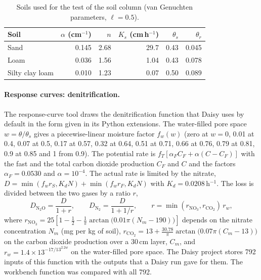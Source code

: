 \begin{table}[H]\centering\small
\caption{Soils used for the test of the soil column (van Genuchten parameters, $\ell=0.5$).}\label{tab:richardssoils}
\begin{tabular}{lrrrrr}\toprule
Soil & $\alpha$ (cm$^{-1}$) & $n$ & $K_s$ (cm\,h$^{-1}$) & $\theta_s$ & $\theta_r$\\\midrule
Sand & 0.145 & 2.68 & 29.7 & 0.43 & 0.045\\
Loam & 0.036 & 1.56 & 1.04 & 0.43 & 0.078\\
Silty clay loam & 0.010 & 1.23 & 0.07 & 0.50 & 0.089\\\bottomrule
\end{tabular}
\end{table}

\paragraph{Response curves: denitrification.}
The response-curve tool draws the denitrification function that Daisy uses by default in the form given in its Python extensions. The water-filled pore space $w=\theta/\theta_s$ gives a piecewise-linear moisture factor $f_w(w)$ (zero at $w=0$, 0.01 at 0.4, 0.07 at 0.5, 0.17 at 0.57, 0.32 at 0.64, 0.51 at 0.71, 0.66 at 0.76, 0.79 at 0.81, 0.9 at 0.85 and 1 from 0.9). The potential rate is $f_T\left[\alpha_F C_F+\alpha(C-C_F)\right]$ with the fast and the total carbon dioxide production $C_F$ and $C$ and the factors $\alpha_F=0.0530$ and $\alpha=10^{-4}$. The actual rate is limited by the nitrate, $D=\min(f_w r_S,K_dN)+\min(f_w r_F,K_dN)$ with $K_d=0.0208$\,h$^{-1}$. The loss is divided between the two gases by a ratio $r$,
\begin{equation}\label{eq:n2o}
D_{\mathrm{N_2O}}=\frac{D}{1+r},\qquad D_{\mathrm{N_2}}=\frac{D}{1+1/r},\qquad r=\min(r_{\mathrm{NO_3}},r_{\mathrm{CO_2}})\,r_w,
\end{equation}
where $r_{\mathrm{NO_3}}=25\left[1-\tfrac12-\tfrac1\pi\arctan\!\big(0.01\pi(N_m-190)\big)\right]$ depends on the nitrate concentration $N_m$ (mg per kg of soil), $r_{\mathrm{CO_2}}=13+\tfrac{30.78}{\pi}\arctan\!\big(0.07\pi(C_m-13)\big)$ on the carbon dioxide production over a 30\,cm layer, $C_m$, and $r_w=1.4\times13^{-17/13^{2.2w}}$ on the water-filled pore space. The Daisy project stores 792 inputs of this function with the outputs that a Daisy run gave for them. The workbench function was compared with all 792.

